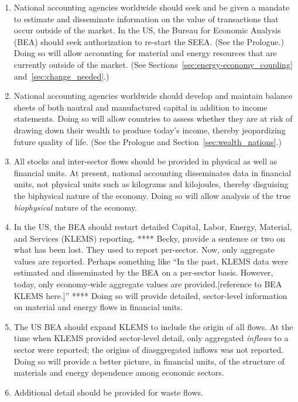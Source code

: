 \begin{enumerate}
	\item{National accounting agencies worldwide should seek and be given
			a mandate to estimate and disseminate information on 
			the value of transactions that occur outside of the market.
			In the US, the Bureau for Economic Analysis (BEA) should seek authorization 
			to re-start the SEEA. 
			(See the Prologue.)
			Doing so will allow accounting for material and energy resources
			that are currently outside of the market.
			(See Sections~\ref{sec:energy-economy_coupling}
			and~\ref{sec:change_needed}.)}
	\item{National accounting agencies worldwide should develop and maintain 
			balance sheets of both nautral and manufactured capital 
			in addition to income statements.
			Doing so will allow countries to assess whether they are at risk of drawing down
			their wealth to produce today's income, 
			thereby jeopardizing future quality of life.
			(See the Prologue and Section~\ref{sec:wealth_nations}.)}
	\item{All stocks and inter-sector flows should be provided 
			in physical as well as financial units.
			At present, national accounting disseminates data in financial units,
			not physical units such as kilograms and kilojoules,
			thereby disguising the biphysical nature of the economy.
			Doing so will allow analysis of the true 
			\emph{biophysical} nature of the economy.}
	\item{In the US, the BEA should restart detailed 
			Capital, Labor, Energy, Material, and Services (KLEMS)
			reporting.
			**** Becky, provide a sentence or two on what has been lost.
			They used to report per-sector. 
			Now, only aggregate values are reported. 
			Perhaps something like
			``In the past, KLEMS data were estimated and disseminated by the BEA
			on a per-sector basis.
			However, today, only economy-wide aggregate values are provided.[reference 
			to BEA KLEMS here.]''
			****
			Doing so will provide detailed, sector-level information 
			on material and energy flows
			in financial units.}
	\item{The US BEA should expand KLEMS to include the origin of all flows.
			At the time when KLEMS provided sector-level detail, 
			only aggregated \emph{inflows} to a sector were reported;
			the origins of diasggregated inflows was not reported.
			Doing so will provide a better picture, in financial units,
			of the structure of materials and energy dependence among economic sectors.}
	\item{Additional detail should be provided for waste flows.
}
\end{enumerate}
